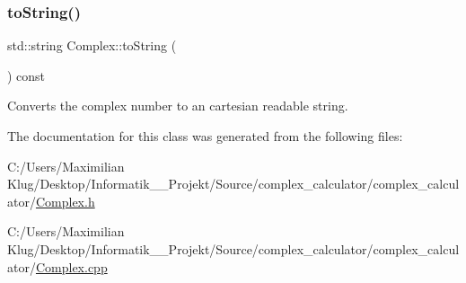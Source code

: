 \mbox{\label{class_complex_af125108c8589740c1b9893aaeae8e64b}} 
\subsubsection{\texorpdfstring{to\+String()}{toString()}}
{\footnotesize\ttfamily std\+::string Complex\+::to\+String (\begin{DoxyParamCaption}{ }\end{DoxyParamCaption}) const}



Converts the complex number to an cartesian readable string. 



The documentation for this class was generated from the following files\+:\begin{DoxyCompactItemize}
\item 
C\+:/\+Users/\+Maximilian Klug/\+Desktop/\+Informatik\+\_\+\_\+\+Projekt/\+Source/complex\+\_\+calculator/complex\+\_\+calculator/\mbox{\hyperlink{_complex_8h}{Complex.\+h}}\item 
C\+:/\+Users/\+Maximilian Klug/\+Desktop/\+Informatik\+\_\+\_\+\+Projekt/\+Source/complex\+\_\+calculator/complex\+\_\+calculator/\mbox{\hyperlink{_complex_8cpp}{Complex.\+cpp}}\end{DoxyCompactItemize}
